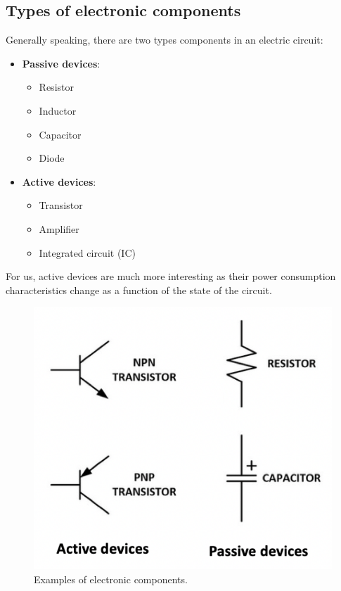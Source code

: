 \subsection{Types of electronic components}

Generally speaking, there are two types components in an electric circuit:
\begin{itemize}
    \item \textbf{Passive devices}: 
    \begin{itemize}
        \item Resistor
        \item Inductor
        \item Capacitor
        \item Diode
    \end{itemize}
    \item \textbf{Active devices}:
    \begin{itemize}
        \item Transistor
        \item Amplifier
        \item Integrated circuit (IC)
    \end{itemize}
\end{itemize}
For us, active devices are much more interesting as their power consumption characteristics change
as a function of the state of the circuit.

\begin{figure}[!ht]
	\centering
	\includegraphics{images/type_of_electronic_components.png}
	\caption{Examples of electronic components.} \label{fig:type_of_electronic_components}
\end{figure}

